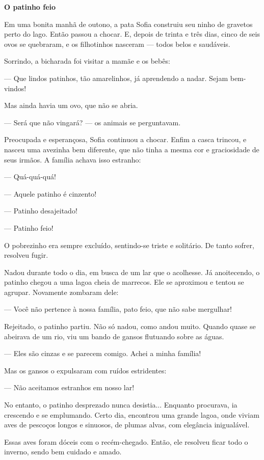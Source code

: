 \begin{escolha}
\textbf{O patinho feio}

Em uma bonita manhã de outono, a pata Sofia construiu seu ninho de
gravetos perto do lago. Então passou a chocar. E, depois de trinta e
três dias, cinco de seis ovos se quebraram, e os filhotinhos nasceram
--- todos belos e saudáveis.

Sorrindo, a bicharada foi visitar a mamãe e os bebês:

--- Que lindos patinhos, tão amarelinhos, já aprendendo a nadar. Sejam
bem-vindos!

Mas ainda havia um ovo, que não se abria.

--- Será que não vingará? --- os animais se perguntavam.

Preocupada e esperançosa, Sofia continuou a chocar. Enfim a casca
trincou, e nasceu uma avezinha bem diferente, que não tinha a mesma cor
e graciosidade de seus irmãos. A família achava isso estranho:

--- Quá-quá-quá!

--- Aquele patinho é cinzento!

--- Patinho desajeitado!

--- Patinho feio!

O pobrezinho era sempre excluído, sentindo-se triste e solitário. De
tanto sofrer, resolveu fugir.

Nadou durante todo o dia, em busca de um lar que o acolhesse. Já
anoitecendo, o patinho chegou a uma lagoa cheia de marrecos. Ele se
aproximou e tentou se agrupar. Novamente zombaram dele:

--- Você não pertence à nossa família, pato feio, que não sabe
mergulhar!

Rejeitado, o patinho partiu. Não só nadou, como andou muito. Quando
quase se abeirava de um rio, viu um bando de gansos flutuando sobre as
águas.

--- Eles são cinzas e se parecem comigo. Achei a minha família!

Mas os gansos o expulsaram com ruídos estridentes:

--- Não aceitamos estranhos em nosso lar!

No entanto, o patinho desprezado nunca desistia... Enquanto procurava,
ia crescendo e se emplumando. Certo dia, encontrou uma grande lagoa,
onde viviam aves de pescoços longos e sinuosos, de plumas alvas, com
elegância inigualável.

Essas aves foram dóceis com o recém-chegado. Então, ele resolveu ficar
todo o inverno, sendo bem cuidado e amado.


\end{escolha}
